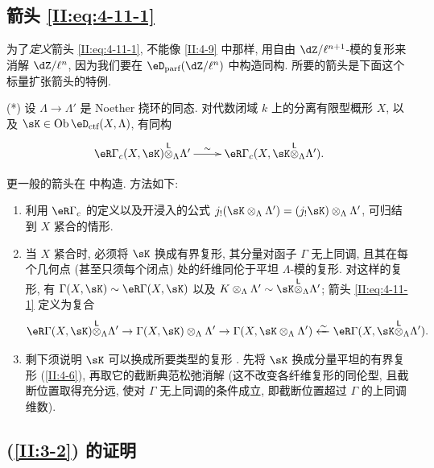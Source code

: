 \subsection{箭头 \texorpdfstring{\eqref{II:eq:4-11-1}}{(4.11.1)}}\label{II:4-12}

为了\emph{定义}箭头 \eqref{II:eq:4-11-1}, 不能像 \ref{II:4-9} 中那样, 用自由 $\dZ/\ell^{n+1}$-模的复形来消解 $\dZ/\ell^n$, 因为我们要在 $\eD_\text{parf}(\dZ/\ell^n)$ 中构造同构. 所要的箭头是下面这个标量扩张箭头的特例.

(*) 设 $\Lambda\to\Lambda'$ 是 Noether 挠环的同态. 对代数闭域 $k$ 上的分离有限型概形 $X$, 以及 $\sK\in\ob\eD_\text{ctf}(X,\Lambda)$, 有同构
\[\xymatrix{
  \eR\Gamma_c(X,\sK)\lotimes_\Lambda \Lambda' \ar[r]^-\sim & \eR \Gamma_c(X,\sK\lotimes_\Lambda \Lambda') \text{.}
}\]

更一般的箭头在 \cite[XVII 4.2.12]{sga4} 中构造. 方法如下:
\begin{enumerate}[\indent a)]
  \item 利用 $\eR\Gamma_c$ 的定义以及开浸入的公式 $j_!(\sK\otimes_\Lambda\Lambda') = (j_! \sK)\otimes_\Lambda\Lambda'$, 可归结到 $X$ 紧合的情形.
  \item 当 $X$ 紧合时, 必须将 $\sK$ 换成有界复形, 其分量对函子 $\Gamma$ 无上同调, 且其在每个几何点 (甚至只须每个闭点) 处的纤维同伦于平坦 $\Lambda$-模的复形. 对这样的复形, 有 $\Gamma(X,\sK)\sim \eR\Gamma(X,\sK)$ 以及 $K\otimes_\Lambda\Lambda'\sim \sK\lotimes_\Lambda\Lambda'$; 箭头 \eqref{II:eq:4-11-1} 定义为复合
    \[
      \eR\Gamma(X,\sK)\lotimes_\Lambda \Lambda' \to \Gamma(X,\sK)\otimes_\Lambda\Lambda' \to \Gamma(X,\sK\otimes_\Lambda\Lambda') \xleftarrow\sim \eR\Gamma(X,\sK\lotimes_\Lambda\Lambda') \text{.}
    \]
  \item 剩下须说明 $\sK$ 可以换成所要类型的复形 \cite[XVII.4.2.10]{sga4}. 先将 $\sK$ 换成分量平坦的有界复形 (\ref{II:4-6}), 再取它的截断典范松弛消解 (这不改变各纤维复形的同伦型, 且截断位置取得充分远, 使对 $\Gamma$ 无上同调的条件成立, 即截断位置超过 $\Gamma$ 的上同调维数).
\end{enumerate}

\subsection{\texorpdfstring{(\ref{II:3-2})}{(3.2)} 的证明}\label{II:4-13}

